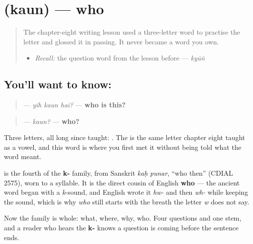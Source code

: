 \section[\texorpdfstring{\ur{کون؟} (kaun?)}{کون؟ (kaun?)}]{ (kaun) — who}

\label{lesson:UR-C21-kaun}



\begin{quote}
The chapter-eight writing lesson used a three-letter word to practise the letter \textbf{} and glossed it in passing. It never became a word you own.

\begin{itemize}
\raggedright
  \item \emph{Recall:} the question word from the lesson before — \emph{kyūṅ}
\end{itemize}
\end{quote}

\subsection*{You'll want to know: }
\begin{quote}
\textbf{  } — \emph{yih kaun hai?} — \textbf{who is this?}
\end{quote}

\begin{quote}
\textbf{} — \emph{kaun?} — \textbf{who?}
\end{quote}

Three letters, all long since taught: \textbf{} \textbf{} \textbf{}. The \textbf{} is the same letter chapter eight taught as a vowel, and this word is where you first met it without being told what the word meant.

\begin{cousinweb}
\textbf{} is the fourth of the \textbf{k-} family, from Sanskrit \emph{kaḥ punar}, \textquotedblleft{}who then\textquotedblright{} (CDIAL 2575), worn to a syllable. It is the direct cousin of English \textbf{who} — the ancient word began with a \emph{k}-sound, and English wrote it \emph{hw-} and then \emph{wh-} while keeping the sound, which is why \emph{who} still starts with the breath the letter \emph{w} does not say.

Now the family is whole: \textbf{} what, \textbf{} where, \textbf{} why, \textbf{} who. Four questions and one stem, and a reader who hears the \textbf{k-} knows a question is coming before the sentence ends.
\end{cousinweb}

